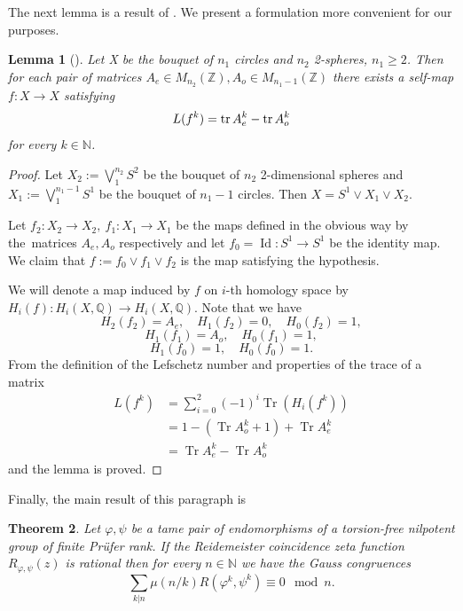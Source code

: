 \documentclass[12pt, a4paper]{amsart}
\def\Z{{\mathbb Z}}
\def\Q{{\mathbb Q}}
\def\Id{\operatorname{Id}}
\def\tr{\mathop{\rm tr}\nolimits}
\def\Tr{\operatorname{Tr}}
\newtheorem{theorem}{Theorem}
\newtheorem{lemma}[theorem]{Lemma}
\def\N{{\mathbb N}}
\begin{document}
The next lemma is a result of \cite[Theorem 2.1]{BaBo}.
We present a formulation more convenient for our purposes.

\begin{lemma}[]\label{thm:integer-matrix-map-bouquet}
  Let X be the bouquet of $n_1$ circles and $n_2$ \rm{2}-spheres, $n_1 \geq 2$.
  Then for each pair of matrices $A_e \in M_{n_2}(\Z), A_o \in M_{n_1-1}(\Z)$
  there exists a self-map $f: X \to X$ satisfying
  \[
    L(f^k) = \tr A_e^k - \tr A_o^k
  \]
  for every $k \in \N$.
\end{lemma}
\begin{proof}
  Let $X_2 := \bigvee_{1}^{n_2} S^2$ be the bouquet of $n_2$ 2-dimensional spheres
  and $X_1 := \bigvee_{1}^{n_1-1} S^1$ be the bouquet of $n_1-1$ circles.
  Then $X = S^1 \vee X_1 \vee X_2$.

  Let $f_2: X_2 \to X_2, \ f_1: X_1 \to X_1$ be the maps defined in the obvious way
  by the~matrices $A_e, A_o$ respectively and let $f_0 = \Id : S^1 \to S^1$ be the identity map.
  We claim that $f := f_0 \vee f_1 \vee f_2$ is the map satisfying the hypothesis.

  We will denote a map induced by $f$ on $i$-th homology space by $H_i(f): H_i(X, \Q) \to H_i(X, \Q)$.
  Note that we have
$$      H_2(f_2) = A_e, \quad H_1(f_2) = 0, \quad H_0(f_2) = 1,$$
$$      H_1(f_1) = A_o, \quad H_0(f_1) = 1,$$
$$      H_1(f_0) = 1,   \quad H_0(f_0) = 1.$$
  From the definition of the Lefschetz number and properties of the trace of a matrix
  \begin{align*}
      L(f^k) &= \sum_{i=0}^2 (-1)^i \Tr(H_i(f^k))\\
      &= 1 - (\Tr A_o^k + 1) + \Tr A_e^k\\
      &= \Tr A_e^k - \Tr A_o^k
  \end{align*}
  and the lemma is proved.
\end{proof}



\bigskip
Finally, the main result of this paragraph is

\begin{theorem}\label{thm:rational-congruences}
  Let $\varphi, \psi$ be a tame pair of endomorphisms of a torsion-free nilpotent group of finite Pr\"ufer rank.
  If the Reidemeister coincidence zeta function $R_{\varphi, \psi}(z)$ is rational then
  for every $n \in \N$ we have the Gauss congruences
  \begin{equation}\label{eq:congruence-coincidence}
    \sum_{k|n} \mu(n/k) R(\varphi^k, \psi^k) \equiv 0 \mod n.
  \end{equation}
\end{theorem}
\end{document}
